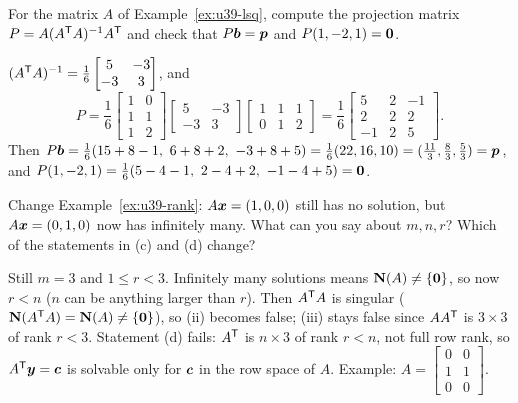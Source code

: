 \begin{exercise}\label{exr:u39-P}
For the matrix $A$ of Example~\ref{ex:u39-lsq}, compute the projection matrix $P=A(A^{\mathsf{T}} A)^{-1}A^{\mathsf{T}}$ and check that $P\boldsymbol{b}=\boldsymbol{p}$ and $P(1,-2,1)=\boldsymbol{0}$.
\end{exercise}
\begin{solution}
$(A^{\mathsf{T}} A)^{-1}=\frac16\begin{bmatrix}5&-3\\-3&3\end{bmatrix}$, and
\[
P=\frac16\begin{bmatrix}1&0\\1&1\\1&2\end{bmatrix}\begin{bmatrix}5&-3\\-3&3\end{bmatrix}\begin{bmatrix}1&1&1\\0&1&2\end{bmatrix}=\frac16\begin{bmatrix}5&2&-1\\2&2&2\\-1&2&5\end{bmatrix}.
\]
Then $P\vb{b}=\frac16(15+8-1,\ 6+8+2,\ -3+8+5)=\frac16(22,16,10)=(\tfrac{11}{3},\tfrac83,\tfrac53)=\vb{p}$, and $P(1,-2,1)=\frac16(5-4-1,\ 2-4+2,\ -1-4+5)=\vb{0}$.
\end{solution}

\begin{exercise}\label{exr:u39-variant}
Change Example~\ref{ex:u39-rank}: $A\boldsymbol{x}=(1,0,0)$ still has no solution, but $A\boldsymbol{x}=(0,1,0)$ now has infinitely many. What can you say about $m,n,r$? Which of the statements in (c) and (d) change?
\end{exercise}
\begin{solution}
Still $m=3$ and $1\le r<3$. Infinitely many solutions means $\mathbf{N}(A)\neq\{\boldsymbol{0}\}$, so now $r<n$ ($n$ can be anything larger than $r$). Then $A^{\mathsf{T}} A$ is singular ($\mathbf{N}(A^{\mathsf{T}} A)=\mathbf{N}(A)\neq\{\boldsymbol{0}\}$), so (ii) becomes false; (iii) stays false since $AA^{\mathsf{T}}$ is $3\times3$ of rank $r<3$. Statement (d) fails: $A^{\mathsf{T}}$ is $n\times3$ of rank $r<n$, not full row rank, so $A^{\mathsf{T}}\boldsymbol{y}=\boldsymbol{c}$ is solvable only for $\boldsymbol{c}$ in the row space of $A$. Example: $A=\begin{bmatrix}0&0\\1&1\\0&0\end{bmatrix}$.
\end{solution}

